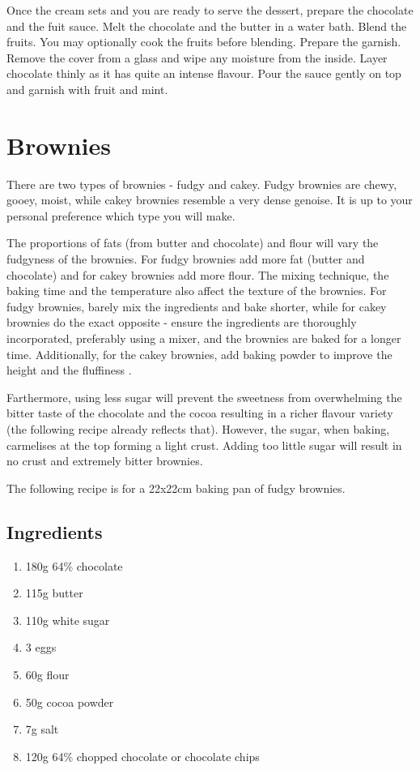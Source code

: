 \documentclass[11pt]{report}
\begin{document}
Once the cream sets and you are ready to serve the dessert, prepare the
chocolate and the fuit sauce. Melt the chocolate and the butter in a water
bath. Blend the fruits. You may optionally cook the fruits before blending.
Prepare the garnish. Remove the cover from a glass and wipe any moisture from
the inside. Layer chocolate thinly as it has quite an intense flavour. Pour the
sauce gently on top and garnish with fruit and mint.

\section{Brownies}
There are two types of brownies - fudgy and cakey. Fudgy brownies are chewy,
gooey, moist, while cakey brownies resemble a very dense genoise. It is up to
your personal preference which type you will make.

The proportions of fats (from butter and chocolate) and flour will vary the
fudgyness of the brownies. For fudgy brownies add more fat (butter and
chocolate) and for cakey brownies add more flour. The mixing technique, the
baking time and the temperature also affect the texture of the brownies. For
fudgy brownies, barely mix the ingredients and bake shorter, while for cakey
brownies do the exact opposite - ensure the ingredients are thoroughly
incorporated, preferably using a mixer, and the brownies are baked for a longer
time. Additionally, for the cakey brownies, add baking powder to improve the
height and the fluffiness .

Farthermore, using less sugar will prevent the sweetness from overwhelming the
bitter taste of the chocolate and the cocoa resulting in a richer flavour
variety (the following recipe already reflects that). However, the sugar, when
baking, carmelises at the top forming a light crust. Adding too little sugar
will result in no crust and extremely bitter brownies.

The following recipe is for a 22x22cm baking pan of fudgy brownies.

\subsection*{Ingredients}
\begin{enumerate}
  \item 180g 64\% chocolate
  \item 115g butter
  \item 110g white sugar
  \item 3 eggs
  \item 60g flour
  \item 50g cocoa powder
  \item 7g salt
  \item 120g 64\% chopped chocolate or chocolate chips
\end{enumerate}
\end{document}

